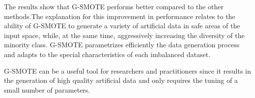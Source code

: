\documentclass[parskip=full]{scrartcl}
\begin{document}
The results show that G-SMOTE performs better compared to the other methods.The explanation for this improvement in performance relates to the ability of G-SMOTE to generate a variety of artificial data in safe areas of the input space, while, at the same time, aggressively increasing the diversity of the minority class. G-SMOTE parametrizes efficiently the data generation process and adapts to the special characteristics of each imbalanced dataset.

G-SMOTE can be a useful tool for researchers and practitioners since it results in the generation of high quality artificial data and only requires the tuning of a small number of parameters.



\end{document}
